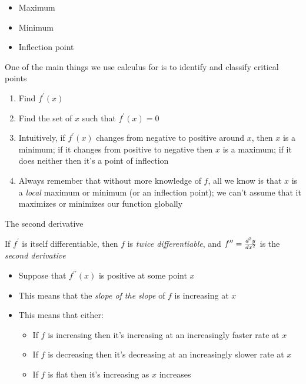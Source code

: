 \documentclass[10pt]{seminar}
\begin{document}
\begin{slide}
\begin{itemize}
\item Maximum
\item Minimum
\item Inflection point
\end{itemize}

\begin{center}
  
\end{center}

\newslide

One of the main things we use calculus for is to identify and classify critical points

\begin{enumerate}
\item Find $f^\prime(x)$
\item Find the set of $x$ such that $f^\prime(x)=0$
\item Intuitively, if $f^\prime(x)$ changes from negative to positive around $x$, then $x$ is a minimum; if it changes from positive to negative then $x$ is a maximum; if it does neither then it's a point of inflection
\item Always remember that without more knowledge of $f$, all we know is that $x$ is a \textit{local} maximum or minimum (or an inflection point); we can't assume that it maximizes or minimizes our function globally
\end{enumerate}

\newslide

The second derivative

If $f^\prime$ is itself differentiable, then $f$ is \textit{twice differentiable}, and $f^{\prime\prime} = {{d^2y}\over{dx^2}}$ is the \textit{second derivative}

\begin{itemize}
\item Suppose that $f^{\prime\prime}(x)$ is positive at some point $x$
\item This means that the \textit{slope of the slope} of $f$ is increasing at $x$
\item This means that either:

\begin{itemize}

\item If $f$ is increasing then it's increasing at an increasingly faster rate at $x$
\item If $f$ is decreasing then it's decreasing at an increasingly slower rate at $x$
\item If $f$ is flat then it's increasing as $x$ increases


\end{itemize}
\end{itemize}
\end{slide}
\end{document}
